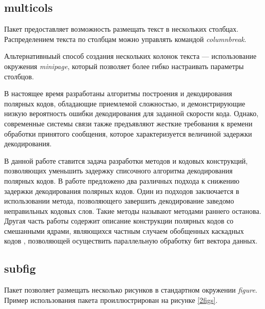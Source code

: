 \subsection{multicols}
Пакет предоставляет возможность размещать текст в нескольких столбцах.
Распределением текста по столбцам можно управлять командой {\em columnbreak}.

Альтернативныый способ создания нескольких колонок текста --- использование окружения {\em minipage}, который позволяет более гибко настраивать параметры столбцов.

\begin{multicols}{3}
В настоящее время разработаны алгоритмы построения и декодирования полярных кодов, обладающие приемлемой сложностью, и демонстрирующие низкую вероятность ошибки декодирования для заданной скорости кода.
Однако, современные системы связи также предъявляют жесткие требования к времени обработки принятого сообщения, которое характеризуется величиной задержки декодирования.

В данной работе ставится задача разработки методов и кодовых конструкций, позволяющих уменьшить задержку списочного алгоритма декодирования полярных кодов.
В работе предложено два различных подхода к снижению задержки декодирования полярных кодов.
Один из подходов заключается в использовании метода, позволяющего завершить декодирование заведомо неправильных кодовых слов. 
Такие методы называют методами раннего останова.
Другая часть работы содержит описание конструкции полярных кодов со смешанными ядрами, являющихся частным случаем обобщенных каскадных кодов \cite{zinoviev1976generalized}, позволяющей осуществить параллельную обработку бит вектора данных.
\end{multicols}

\subsection{subfig}
Пакет позволяет размещать несколько рисунков в стандартном окружении {\em figure}.
Пример использования пакета проиллюстрирован на рисунке \ref{2figs}.

